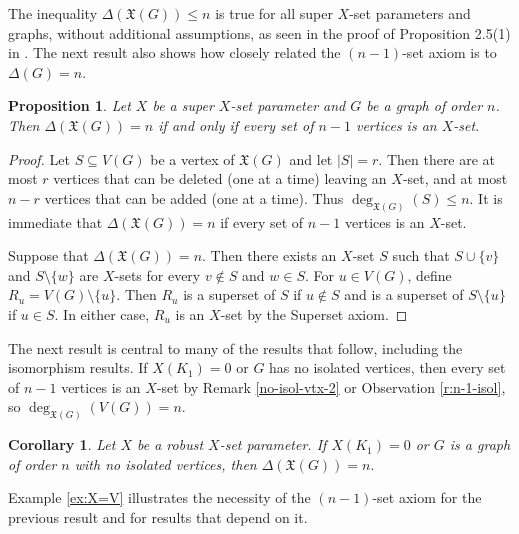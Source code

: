 \documentclass{article}
\def\blu{\color{blue}}
\numberwithin{figure}{section}
\numberwithin{table}{section}
\numberwithin{equation}{section}
\newtheorem{cor}[thm]{Corollary}
\newtheorem{prop}[thm]{Proposition}
\theoremstyle{definition}
\theoremstyle{definition}
\theoremstyle{definition}
\newcommand{\Xr}{X}
\newcommand{\xtar}{\mathfrak{X}}%
\begin{document}
{The inequality $\Delta(\xtar (G))\le n$ is true  for all super $X$-set parameters and graphs, without additional assumptions, as seen in the proof of Proposition 2.5(1) in \cite{PDrecon}.  The next result also
shows how closely related the $(n-1)$-set axiom is to $\Delta(G)=n$.  



 \begin{prop}\label{need-n-1}
Let $X$ be a super $X$-set parameter and $G$ be a graph of order $n$. Then $\Delta(\xtar(G))=n$ if and only if every set of $n - 1$ vertices is an $X$-set. %
\end{prop}
\begin{proof}
 {\blu Let $S\subseteq V(G)$ be a vertex of $\xtar(G)$ and let $|S|=r$. Then there are at most $r$ vertices that can be deleted (one at a time) leaving an $X$-set, and at most $n-r$ vertices that can be added (one at a time).  Thus $\deg_{\xtar(G)}(S)\le n$.} It is  immediate that $ \Delta(\xtar(G))=n$  if every set of $n - 1$ vertices is an $X$-set. 

 Suppose that $ \Delta(\xtar(G))=n$. Then there exists an $X$-set $S$ such that $S\cup \{v\}$ and $S\setminus\{w\}$ are $X$-sets for every $v\notin S$ and $w\in S$. For $u\in V(G)$, define $R_u = V(G)\setminus \{u\}$. Then $R_u$ is a superset of $S$ if $u\notin S$ and is a superset of $S\setminus \{u\}$ if $u\in S$. In either case, $R_u$ is an $X$-set by the Superset axiom.
\end{proof}


 
 The  next result    is central to many of the results that follow, including the isomorphism results. If $X(K_1)=0$ or   $G$ has no isolated vertices,  then   every set of $n-1$ vertices is an $\Xr$-set by   Remark \ref{no-isol-vtx-2} or Observation \ref{r:n-1-isol}, so $\deg_{\xtar(G)}(V(G))= n$.  

 

\begin{cor}\label{x-deg} 
 Let $X$ be a robust $X$-set parameter.  If $X(K_1)=0$ or   $G$ is a graph  of order $n$ with no isolated vertices, 
then $\Delta(\xtar (G))=n.$
\end{cor}


  
 Example \ref{ex:X=V} illustrates the necessity of the $(n-1)$-set axiom for the previous result   and for results that depend on it. 
  




}
\end{document}
